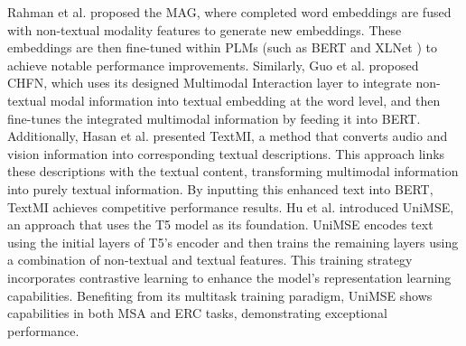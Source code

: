 	Rahman et al.  proposed the MAG, where completed word embeddings are fused with non-textual modality features to generate new embeddings. These embeddings are then fine-tuned within PLMs (such as BERT and XLNet \cite{yang2019xlnet}) to achieve notable performance improvements.
	Similarly, Guo et al.  proposed CHFN, which uses its designed Multimodal Interaction layer to integrate non-textual modal information into textual embedding at the word level, and then fine-tunes the integrated multimodal information by feeding it into BERT.  
	Additionally, Hasan et al.  presented TextMI, a method that converts audio and vision information into corresponding textual descriptions. This approach links these descriptions with the textual content, transforming multimodal information into purely textual information. By inputting this enhanced text into BERT, TextMI achieves competitive performance results.
	Hu et al.  introduced UniMSE, an approach that uses the T5 \cite{raffel2020exploring} model as its foundation. UniMSE encodes text using the initial layers of T5's encoder and then trains the remaining layers using a combination of non-textual and textual features. This training strategy incorporates contrastive learning to enhance the model's representation learning capabilities. Benefiting from its multitask training paradigm, UniMSE shows capabilities in both MSA and ERC tasks, demonstrating exceptional performance.
